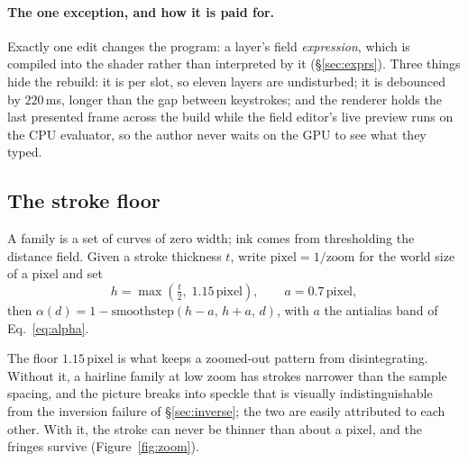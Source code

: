 \paragraph{The one exception, and how it is paid for.}
Exactly one edit changes the program: a layer's field \emph{expression}, which is
compiled into the shader rather than interpreted by it (\S\ref{sec:exprs}).
Three things hide the rebuild: it is per slot, so eleven layers are undisturbed;
it is debounced by $220$\,ms, longer than the gap between keystrokes; and the
renderer holds the last presented frame across the build while the field editor's
live preview runs on the CPU evaluator, so the author never waits on the GPU to
see what they typed.

\subsection{The stroke floor}
\label{sec:zoom}

A family is a set of curves of zero width; ink comes from thresholding the
distance field. Given a stroke thickness $t$, write $\mathrm{pixel}=1/\mathrm{zoom}$
for the world size of a pixel and set
\begin{equation}
  h=\max\!\left(\tfrac{t}{2},\; 1.15\,\mathrm{pixel}\right),
  \qquad
  a = 0.7\,\mathrm{pixel},
  \label{eq:stroke}
\end{equation}
then $\alpha(d)=1-\mathrm{smoothstep}(h-a,\,h+a,\,d)$, with $a$ the antialias
band of Eq.~\ref{eq:alpha}.

The floor $1.15\,\mathrm{pixel}$ is what keeps a zoomed-out pattern from
disintegrating. Without it, a hairline family at low zoom has strokes narrower
than the sample spacing, and the picture breaks into speckle that is visually
indistinguishable from the inversion failure of \S\ref{sec:inverse}; the
two are easily attributed to each other. With it, the stroke can never be
thinner than about a pixel, and the fringes survive (Figure~\ref{fig:zoom}).


